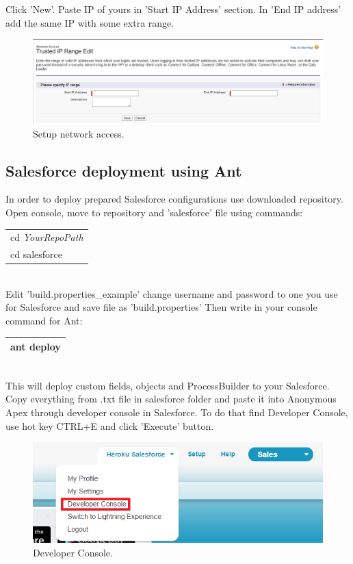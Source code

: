 \documentclass[12pt,a4paper]{article}
\begin{document}
Click 'New'. Paste IP of yours in 'Start IP Address' section. In 'End IP address' add the same IP with some extra range.

\begin{figure}[H]
	\centering
	\includegraphics[width = 1 \textwidth]{images/network2.PNG}
	\caption{Setup network access.}
	\label{fig:setupp}
\end{figure}

\subsection{Salesforce deployment using Ant}
In order to deploy prepared Salesforce configurations use downloaded repository. Open console, move to repository and 'salesforce' file using commands:\\

\begin{tabular}{|l|}
	\hline
	cd \textit{YourRepoPath}\\
	cd salesforce\\
	\hline
\end{tabular}\\

Edit 'build.properties\_example' change username and password to one you use for Salesforce and save file as 'build.properties'
Then write in your console command for Ant:

\begin{tabular}{|l|}
	\hline
	ant deploy\\
	\hline
\end{tabular}\\


This will deploy custom fields, objects and ProcessBuilder to your  Salesforce.\\
Copy everything from .txt file in salesforce folder and paste it into Anonymous Apex through developer console in Salesforce.
To do that find Developer Console, use hot key CTRL+E and click 'Execute' button.

\begin{figure}[H]
	\centering
	\includegraphics[width=1\textwidth]{images/deploy1.PNG}
	\caption{Developer Console.}
	\label{fig:console}
\end{figure}
\end{document}
